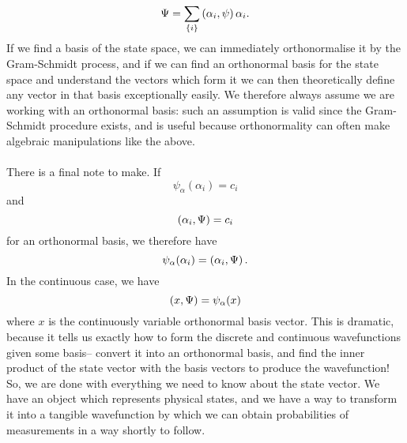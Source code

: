 $$
\Psi=\sum_{\{i\}}\left(\alpha_{i},\psi\right)\alpha_{i}.
$$
If we find a basis of the state space, we can immediately orthonormalise it by the Gram-Schmidt process, and if we can find an orthonormal basis for the state space and understand the vectors which form it we can then theoretically define any vector in that basis exceptionally easily. We therefore always assume we are working with an orthonormal basis: such an assumption is valid since the Gram-Schmidt procedure exists, and is useful because orthonormality can often make algebraic manipulations like the above.
\\\\
There is a final note to make. If 
$$
{\psi}_{\alpha}(\alpha_{i})=c_{i}
$$
and 
$$
\left(\alpha_{i},\Psi\right)=c_{i}
$$
for an orthonormal basis, we therefore have 
$$
{\psi}_{\alpha}(\alpha_{i})=\left(\alpha_{i},\Psi\right).
$$
In the continuous case, we have 
$$
\left(x,\Psi\right)=\psi_{\alpha}(x)
$$
where $x$ is the continuously variable orthonormal basis vector. This is dramatic, because it tells us exactly how to form the discrete and continuous wavefunctions given some basis-- convert it into an orthonormal basis, and find the inner product of the state vector with the basis vectors to produce the wavefunction! So, we are done with everything we need to know about the state vector. We have an object which represents physical states, and we have a way to transform it into a tangible wavefunction by which we can obtain probabilities of measurements in a way shortly to follow.
